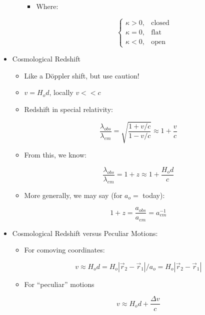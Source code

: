 \begin{itemize}
\begin{itemize}
\begin{itemize}
          \item Where:

            $$\left\{\begin{array}{ll}\kappa>0,&\text{closed}\\\kappa=0,&\text{flat}\\\kappa<0,&\text{open}\end{array}$$

        \end{itemize}

    \end{itemize}

  \item Cosmological Redshift

    \begin{itemize}

      \item Like a D\"oppler shift, but use caution!

      \item $v=H_od$, locally $v<<c$

      \item Redshift in special relativity:

        $$\frac{\lambda_{obs}}{\lambda_{em}}=\sqrt{\frac{1+v/c}{1-v/c}}\approx1+\frac{v}{c}$$

      \item From this, we know:

        $$\frac{\lambda_{obs}}{\lambda_{em}}=1+z\approx 1+\frac{H_o d}{c}$$

      \item More generally, we may say (for $a_o=$ today):

        $$1+z=\frac{a_{obs}}{a_{em}}=a_{em}^{-1}$$

    \end{itemize}

  \item Cosmological Redshift versus Peculiar Motions:

    \begin{itemize}

      \item For comoving coordinates:

        $$v\approx H_od=H_o|\vec{r}_2-\vec{r}_1|/a_o=H_o|\vec{r}_2-\vec{r}_1|$$
        
      \item For ``peculiar'' motions

        $$v\approx H_od+\frac{\Delta v}{c}$$


\end{itemize}
\end{itemize}
